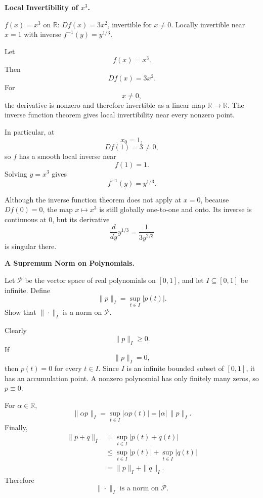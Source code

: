 \begin{problem}[CP-II-0123]
\label{prob:cp-ii-0123}
\textbf{Local Invertibility of \(x^3\).}

\hspace*{1.5em}$f(x)=x^3$ on $\mathbb{R}$: $Df(x)=3x^2$, invertible for $x\ne0$.
	Locally invertible near $x=1$ with inverse $f^{-1}(y)=y^{1/3}$.
\end{problem}

\begin{solution}
Let
\[
f(x)=x^3.
\]
Then
\[
Df(x)=3x^2.
\]
For
\[
x\neq0,
\]
the derivative is nonzero and therefore invertible as a linear map
\(\mathbb R\to\mathbb R\). The inverse function theorem gives local invertibility near every
nonzero point.

In particular, at
\[
x_0=1,
\]
\[
Df(1)=3\neq0,
\]
so \(f\) has a smooth local inverse near
\[
f(1)=1.
\]
Solving \(y=x^3\) gives
\[
\boxed{
f^{-1}(y)=y^{1/3}.
}
\]

Although the inverse function theorem does not apply at \(x=0\), because \(Df(0)=0\), the
map \(x\mapsto x^3\) is still globally one-to-one and onto. Its inverse is continuous at
\(0\), but its derivative
\[
\frac{d}{dy}y^{1/3}
=
\frac1{3y^{2/3}}
\]
is singular there.
\end{solution}


\begin{problem}[CP-II-0124]
\label{prob:cp-ii-0124}
\textbf{A Supremum Norm on Polynomials.}

\hspace*{1.5em}Let \(\mathcal P\) be the vector space of real polynomials on
\([0,1]\), and let \(I\subseteq[0,1]\) be infinite. Define
\[
\|p\|_I=\sup_{t\in I}|p(t)|.
\]
Show that \(\|\cdot\|_I\) is a norm on \(\mathcal P\).
\end{problem}

\begin{solution}
Clearly
\[
\|p\|_I\ge0.
\]
If
\[
\|p\|_I=0,
\]
then \(p(t)=0\) for every \(t\in I\). Since \(I\) is an infinite
bounded subset of \([0,1]\), it has an accumulation point. A nonzero
polynomial has only finitely many zeros, so \(p\equiv0\).

For \(\alpha\in\mathbb R\),
\[
\|\alpha p\|_I
=
\sup_{t\in I}|\alpha p(t)|
=
|\alpha|\,\|p\|_I.
\]
Finally,
\[
\begin{aligned}
\|p+q\|_I
&=
\sup_{t\in I}|p(t)+q(t)|\\
&\le
\sup_{t\in I}|p(t)|
+
\sup_{t\in I}|q(t)|\\
&=
\|p\|_I+\|q\|_I.
\end{aligned}
\]
Therefore
\[
\boxed{\|\cdot\|_I\text{ is a norm on }\mathcal P.}
\]
\end{solution}


